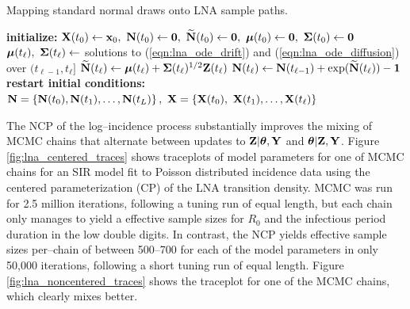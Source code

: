 \begin{algorithm}
	\caption{Mapping standard normal draws onto LNA sample paths.}
	\label{alg:doLNA}
	\begin{algorithmic}[1]
		\State \textbf{initialize: }$ \bX(t_0) \gets \bx_0,\ \bN(t_0) \gets \bs{0},\ \bNtil(t_0) \gets \bs{0},\ \bmu(t_0) \gets \bs{0},\ \bSigma(t_0) \gets \bs{0} $
		\State $ \boldsymbol{\mu}(t_\ell),\ \boldsymbol{\Sigma}(t_\ell) \gets $ solutions to (\ref{eqn:lna_ode_drift}) and (\ref{eqn:lna_ode_diffusion}) over $ (t_{\ell-1}, t_\ell] $
		\State $ \widetilde{\mathbf{N}}(t_\ell)\gets \boldsymbol{\mu}(t_\ell) + \boldsymbol{\Sigma}(t_\ell)^{1/2}\mathbf{Z}(t_\ell) $ 
		\State $ \mathbf{N}(t_\ell)\gets \mathbf{N}(t_{\ell-1}) + \exp(\widetilde{\mathbf{N}}(t_\ell)) - \boldsymbol{1} $
		\State \textbf{restart initial conditions:} 
		\EndFor
		\State \hspace{-0.25in}\Return {}
		\State$\mathbf{N} = \left \lbrace\mathbf{N}(t_0),\mathbf{N}(t_1),\dots,\mathbf{N}(t_L)\right \rbrace,\ \mathbf{X} = \left \lbrace \mathbf{X}(t_0),\ \mathbf{X}(t_1),\dots,\mathbf{X}(t_\ell) \right \rbrace $
		\EndProcedure
	\end{algorithmic}
\end{algorithm}

The NCP of the log--incidence process substantially improves the mixing of MCMC chains that alternate between updates to $ \mathbf{Z}|\boldsymbol{\theta},\mathbf{Y} $ and $ \boldsymbol{\theta}|\mathbf{Z},\mathbf{Y} $. Figure \ref{fig:lna_centered_traces} shows traceplots of model parameters for one of MCMC chains for an SIR model fit to Poisson distributed incidence data using the centered parameterization (CP) of the LNA transition density. MCMC was run for 2.5 million iterations, following a tuning run of equal length, but each chain only manages to yield a effective sample sizes for $ R_0 $ and the infectious period duration in the low double digits. In contrast, the NCP yields effective sample sizes per--chain of between 500--700 for each of the model parameters in only 50,000 iterations, following a short tuning run of equal length. Figure \ref{fig:lna_noncentered_traces} shows the traceplot for one of the MCMC chains, which clearly mixes better. 

